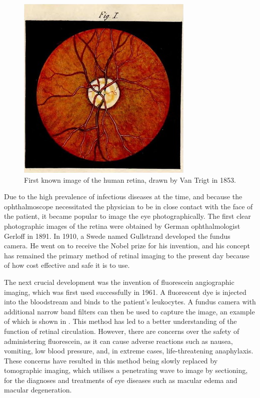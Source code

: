 \begin{figure}[H]
\centering
  \includegraphics{figures/first_human_retina}
\caption{First known image of the human retina, drawn by Van Trigt in 1853.\cite{van1853dissertatio}}
\label{fig:human_retina}
\end{figure}

Due to the high prevalence of infectious diseases at the time, and because
the ophthalmoscope necessitated the physician to be in close contact with
the face of the patient, it became popular to image the eye photographically.
The first clear photographic images of the retina were obtained by German ophthalmologist Gerloff in 1891.\cite{gerloffphoto}  In 1910, a Swede named
Gullstrand developed the fundus camera.\cite{gullstrandcamera}  He went on
to receive the Nobel prize for his invention, and his concept has remained the
primary method of retinal imaging to the present day because of how cost
effective and safe it is to use.  

The next crucial development was the invention of fluorescein angiographic
imaging, which was first used successfully in 1961.  A fluorescent dye is
injected into the bloodstream and binds to the patient's leukocytes.
\cite{novotny1961method}  A fundus camera with additional narrow band
 filters can then be used to capture the image, an example of which is shown
in .  This method has led to a better understanding
of the function of retinal circulation.  However, there are concerns over the
safety of administering fluorescein, as it can cause adverse reactions such
as nausea, vomiting, low blood pressure, and, in extreme cases, life-threatening
anaphylaxis. These concerns have resulted in this method being slowly
replaced by tomographic imaging, which utilises a penetrating wave to image
by sectioning, for the diagnoses and treatments of eye diseases such as macular
edema and macular degeneration. 

